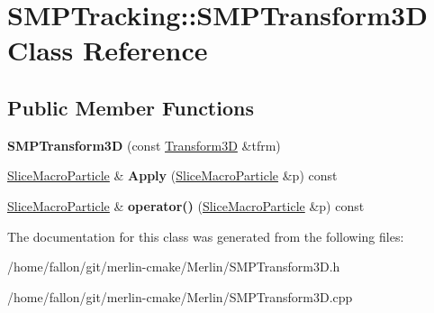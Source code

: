 \hypertarget{classSMPTracking_1_1SMPTransform3D}{}\section{S\+M\+P\+Tracking\+:\+:S\+M\+P\+Transform3D Class Reference}
\label{classSMPTracking_1_1SMPTransform3D}
\subsection*{Public Member Functions}
\begin{DoxyCompactItemize}
\item 
\mbox{\label{classSMPTracking_1_1SMPTransform3D_a37d5a8a6a23038955fd002a0ec1963a3}} 
{\bfseries S\+M\+P\+Transform3D} (const \hyperlink{classTransform3D}{Transform3D} \&tfrm)
\item 
\mbox{\label{classSMPTracking_1_1SMPTransform3D_acbe429e0dadfbad8b04ea0d4149ace1a}} 
\hyperlink{classSMPTracking_1_1SliceMacroParticle}{Slice\+Macro\+Particle} \& {\bfseries Apply} (\hyperlink{classSMPTracking_1_1SliceMacroParticle}{Slice\+Macro\+Particle} \&p) const
\item 
\mbox{\label{classSMPTracking_1_1SMPTransform3D_a4d0722bfb86e6419aa6b367210f1044f}} 
\hyperlink{classSMPTracking_1_1SliceMacroParticle}{Slice\+Macro\+Particle} \& {\bfseries operator()} (\hyperlink{classSMPTracking_1_1SliceMacroParticle}{Slice\+Macro\+Particle} \&p) const
\end{DoxyCompactItemize}


The documentation for this class was generated from the following files\+:\begin{DoxyCompactItemize}
\item 
/home/fallon/git/merlin-\/cmake/\+Merlin/S\+M\+P\+Transform3\+D.\+h\item 
/home/fallon/git/merlin-\/cmake/\+Merlin/S\+M\+P\+Transform3\+D.\+cpp\end{DoxyCompactItemize}
